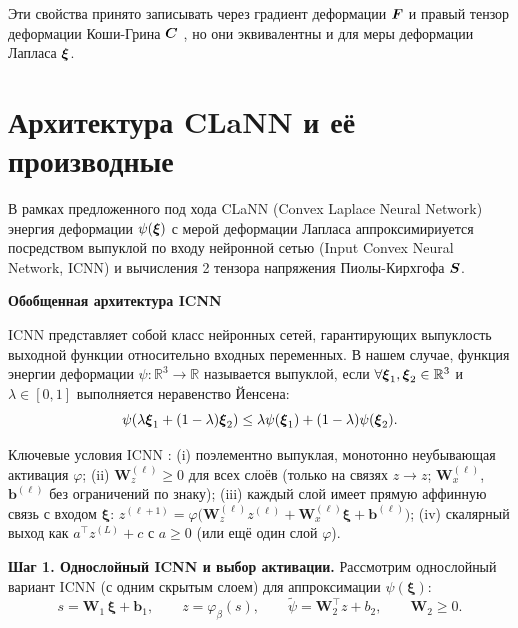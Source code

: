 Эти свойства принято записывать через градиент деформации $\boldsymbol{F}$ и правый тензор деформации Коши-Грина $\boldsymbol{C}$ 
\cite{antman2005nonlin,green1839laws,kirchhoff1850gleichgewicht}, но они эквивалентны и для меры деформации Лапласа $\boldsymbol{\xi}$.


\section{Архитектура CLaNN и её производные}


В рамках предложенного под  хода CLaNN (Convex Laplace Neural Network)
энергия деформации \(\psi(\boldsymbol{\xi})\) с мерой деформации Лапласа аппроксимириуется посредством 
выпуклой по входу нейронной сетью (Input Convex Neural Network, ICNN) \cite{icnn2017}
и вычисления 2 тензора напряжения Пиолы-Кирхгофа \(\boldsymbol{S}\). 

\textbf{Обобщенная архитектура ICNN}

ICNN представляет собой класс нейронных сетей, гарантирующих выпуклость выходной функции относительно входных переменных. 
В нашем случае, функция энергии деформации $\psi: \mathbb{R}^3 \rightarrow \mathbb{R}$ называется выпуклой, 
если $\forall \boldsymbol{\xi}_1, \boldsymbol{\xi}_2 \in \mathbb{R}^3$ и $\lambda \in [0,1]$ выполняется неравенство Йенсена:
\begin{equation}
\psi(\lambda \boldsymbol{\xi}_1 + (1-\lambda) \boldsymbol{\xi}_2) \leq \lambda \psi(\boldsymbol{\xi}_1) + (1-\lambda) \psi(\boldsymbol{\xi}_2).
\label{eq:convexity_definition}
\end{equation}

Ключевые условия ICNN \cite{icnn2017}: 
(i) поэлементно выпуклая, монотонно неубывающая активация $\varphi$; 
(ii) $\mathbf{W}_z^{(\ell)}\!\ge\!0$ для всех слоёв 
(только на связях $z\!\to\!z$; $\mathbf{W}_x^{(\ell)}$, $\mathbf{b}^{(\ell)}$ без ограничений по знаку); 
(iii) каждый слой имеет прямую аффинную связь с входом 
$\boldsymbol{\xi}$: $z^{(\ell+1)}=\varphi\!\big(\mathbf{W}_z^{(\ell)}z^{(\ell)}+\mathbf{W}_x^{(\ell)}\boldsymbol{\xi}+\mathbf{b}^{(\ell)}\big)$; 
(iv) скалярный выход как $a^{\top} z^{(L)}+c$ с $a\!\ge\!0$ (или ещё один слой $\varphi$).

\textbf{Шаг 1. Однослойный ICNN и выбор активации.}
Рассмотрим однослойный вариант ICNN (с одним скрытым слоем) для аппроксимации $\psi(\boldsymbol{\xi})$:
\begin{equation}
  s = \mathbf{W}_1 \,\boldsymbol{\xi} + \mathbf{b}_1,\qquad
  z = \varphi_{\beta}(s),\qquad
  \tilde{\psi} = \mathbf{W}_2^{\top} z + b_2,\qquad \mathbf{W}_2 \ge 0.
  \label{eq:icnn_onelayer}
\end{equation}

